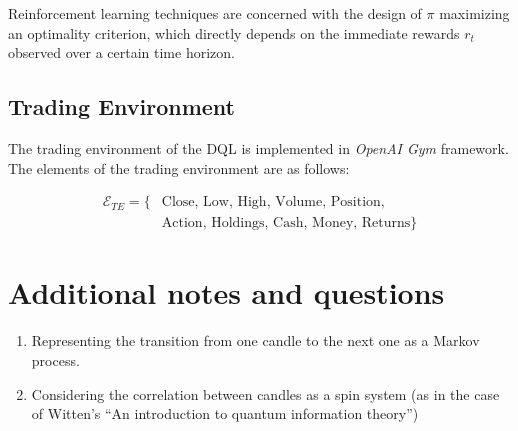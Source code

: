 \documentclass[twocolumn,aps,pra,superscriptaddress,nofootinbib,longbibliography]{revtex4-2}
\begin{document}
Reinforcement learning techniques are concerned with the design of \(\pi\) maximizing an optimality criterion, which directly depends on the immediate rewards \(r_t\) observed over a certain time horizon.  

\subsection{Trading Environment}

The trading environment of the DQL is implemented in \textit{OpenAI Gym} framework. The elements of the trading environment are as follows:

\begin{align}
    \mathcal{E}_{TE} = \{&\text{Close, Low, High, Volume, Position,} \\
                         &\text{Action, Holdings, Cash, Money, Returns}\}
\end{align}



\section{Additional notes and questions}

\begin{enumerate}
    \item Representing the transition from one candle to the next one as a Markov process.
    \item Considering the correlation between candles as a spin system (as in the case of Witten's ``An introduction to quantum information theory'') 
\end{enumerate}


\clearpage



\end{document}
